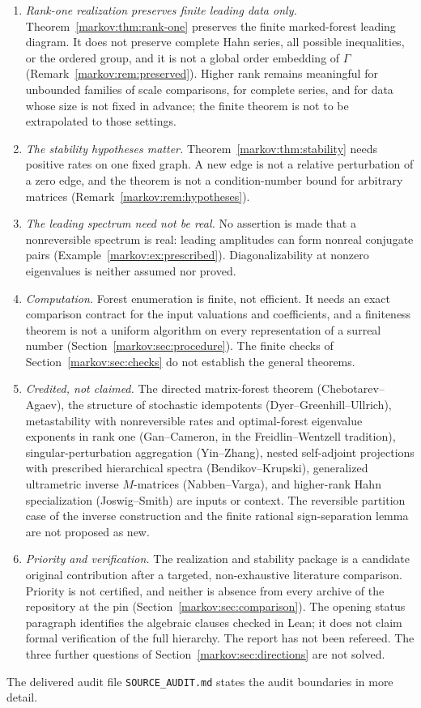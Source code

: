 \documentclass[11pt]{article}
\numberwithin{equation}{section}
\theoremstyle{definition}
\theoremstyle{remark}
\begin{document}
\begin{enumerate}[label=(N\arabic*),leftmargin=3.2em]
or typical-transition-graph hierarchies of the metastability literature, which
can contain more scales.
\item \emph{Rank-one realization preserves finite leading data only.}
Theorem~\ref{markov:thm:rank-one} preserves the finite marked-forest leading
diagram. It does not preserve complete Hahn series, all possible inequalities,
or the ordered group, and it is not a global order embedding of $\Gamma$
(Remark~\ref{markov:rem:preserved}). Higher rank remains meaningful for
unbounded families of scale comparisons, for complete series, and for data whose
size is not fixed in advance; the finite theorem is not to be extrapolated to
those settings.
\item \emph{The stability hypotheses matter.}
Theorem~\ref{markov:thm:stability} needs positive rates on one fixed graph. A
new edge is not a relative perturbation of a zero edge, and the theorem is not
a condition-number bound for arbitrary matrices
(Remark~\ref{markov:rem:hypotheses}).
\item \emph{The leading spectrum need not be real.} No assertion is made that a
nonreversible spectrum is real: leading amplitudes can form nonreal conjugate
pairs (Example~\ref{markov:ex:prescribed}). Diagonalizability at nonzero
eigenvalues is neither assumed nor proved.
\item \emph{Computation.} Forest enumeration is finite, not efficient. It needs
an exact comparison contract for the input valuations and coefficients, and a
finiteness theorem is not a uniform algorithm on every representation of a
surreal number (Section~\ref{markov:sec:procedure}). The finite checks of
Section~\ref{markov:sec:checks} do not establish the general theorems.
\item \emph{Credited, not claimed.} The directed matrix-forest theorem
(Chebotarev--Agaev), the structure of stochastic idempotents
(Dyer--Greenhill--Ullrich), metastability with nonreversible rates and
optimal-forest eigenvalue exponents in rank one (Gan--Cameron, in the
Freidlin--Wentzell tradition), singular-perturbation aggregation (Yin--Zhang),
nested self-adjoint projections with prescribed hierarchical spectra
(Bendikov--Krupski), generalized ultrametric inverse $M$-matrices
(Nabben--Varga), and higher-rank Hahn specialization (Joswig--Smith) are
inputs or context. The reversible partition case of the inverse construction
and the finite rational sign-separation lemma are not proposed as new.
\item \emph{Priority and verification.} The realization and stability package
is a candidate original contribution after a targeted, non-exhaustive
literature comparison. Priority is not certified, and neither is absence from
every archive of the repository at the pin
(Section~\ref{markov:sec:comparison}). The opening status paragraph identifies
the algebraic clauses checked in Lean; it does not claim formal verification of
the full hierarchy. The report has not been refereed. The three further
questions of
Section~\ref{markov:sec:directions} are not solved.
\end{enumerate}
The delivered audit file \texttt{SOURCE\_AUDIT.md} states the audit boundaries
in more detail.
\end{document}
